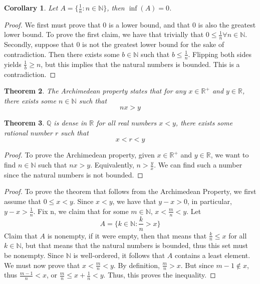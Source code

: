 \documentclass{article}
\newtheorem{theorem}{Theorem}[section]
\newtheorem{corollary}[theorem]{Corollary}
\begin{document}
\begin{corollary}
    Let $A = \{\frac{1}{n} : n \in \mathbb{N}\}$, then $\inf(A) = 0$.
\end{corollary}

\begin{proof}
    We first must prove that 0 is a lower bound, and that 0 is also the greatest lower bound. To prove the first claim, we have that trivially that $0 \leq \frac{1}{n} \forall n \in \mathbb{N}$. 
    Secondly, suppose that 0 is not the greatest lower bound for the sake of contradiction. Then there exists some $b \in \mathbb{N}$ such that $b \leq \frac{1}{n}$. Flipping both sides yields $\frac{1}{b} \geq n$, but this implies that the natural numbers is bounded. This is a contradiction. 
\end{proof}

\begin{theorem}
    The Archimedean property states that for any $x \in \mathbb{R}^+$ and $y \in \mathbb{R}$, there exists some $n \in \mathbb{N}$ such that
    \begin{equation}
        nx > y
    \end{equation}
\end{theorem}

\begin{theorem}
    $\mathbb{Q}$ is dense in $\mathbb{R}$ for all real numbers $x < y$, there exists some rational number $r$ such that 
    \begin{equation}
        x < r < y
    \end{equation}
\end{theorem}

\begin{proof}
    To prove the Archimedean property, given $x \in \mathbb{R}^+$ and $y \in \mathbb{R}$, we want to find $n \in \mathbb{N}$ such that $nx > y$. Equivalently, $n > \frac{y}{x}$. We can find such a number since the natural numbers is not bounded. 
\end{proof}

\begin{proof}
    To prove the theorem that follows from the Archimedean Property, we first assume that $0 \leq x < y$. Since $x < y$, we have that $y - x > 0$, in particular, $y - x > \frac{1}{n}$. Fix n, we claim that for some $m \in \mathbb{N}$, $x < \frac{m}{n} < y$. Let
    \begin{equation}
        A = \{k \in \mathbb{N} : \frac{k}{n} > x\}
    \end{equation}
    Claim that $A$ is nonempty, if it were empty, then that means that $\frac{k}{n} \leq x$ for all $k \in \mathbb{N}$, but that means that the natural numbers is bounded, thus this set must be nonempty. Since $\mathbb{N}$ is well-ordered, it follows that $A$ contains a least element. We must now prove that $x < \frac{m}{n} < y$. By definition, $\frac{m}{n} > x$. 
    But since $m -1 \notin x$, thus $\frac{m - 1}{n} < x$, or $\frac{m}{n} \leq x + \frac{1}{n} < y$. Thus, this proves the inequality. 
\end{proof}
\end{document}

